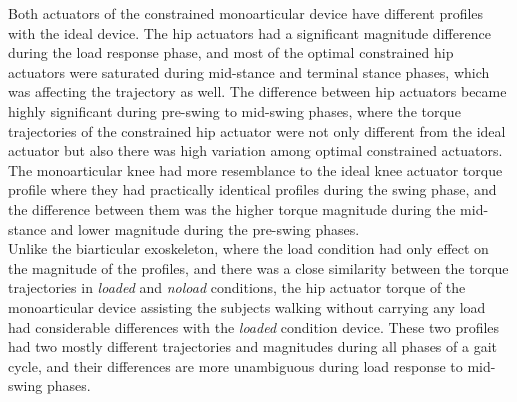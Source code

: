 \documentclass[10pt,letterpaper]{article}
\begin{document}
Both actuators of the constrained monoarticular device have different profiles with the ideal device. The hip actuators had a significant magnitude difference during the load response phase, and most of the optimal constrained hip actuators were saturated during mid-stance and terminal stance phases, which was affecting the trajectory as well. The difference between hip actuators became highly significant during pre-swing to mid-swing phases, where the torque trajectories of the constrained hip actuator were not only different from the ideal actuator but also there was high variation among optimal constrained actuators. The monoarticular knee had more resemblance to the ideal knee actuator torque profile where they had practically identical profiles during the swing phase, and the difference between them was the higher torque magnitude during the mid-stance and lower magnitude during the pre-swing phases.\\
Unlike the biarticular exoskeleton, where the load condition had only effect on the magnitude of the profiles, and there was a close similarity between the torque trajectories in \textit{loaded} and \textit{noload} conditions, the hip actuator torque of the monoarticular device assisting the subjects walking without carrying any load had considerable differences with the \textit{loaded} condition device. These two profiles had two mostly different trajectories and magnitudes during all phases of a gait cycle, and their differences are more unambiguous during load response to mid-swing phases.\\
\end{document}
